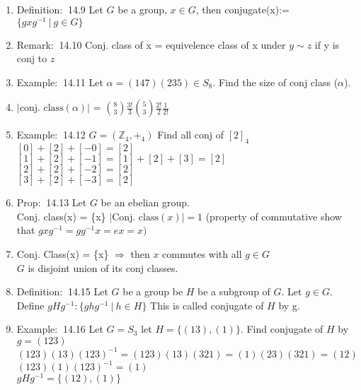 \documentclass[12pt]{article}
\newcommand{\defi}{{\color{blue} Definition: $\ $}}
\newcommand{\exe}{{\color{green} Example: $\ $}}
\newcommand{\prop}{{\color{blue} Prop: $\ $}}
\newcommand{\rem}{{\color{blue} Remark: $\ $}}
\begin{document}
\begin{enumerate}
\begin{enumerate}
        \item \defi 14.9 Let $G$ be a group, $x \in G$, then conjugate(x):= $\{gxg^{-1} \ | \ g \in G\}$
        
        \item \rem 14.10 Conj. class of x = equivelence class of x under $y \sim z$ if y is conj to $z$
        
        \item \exe 14.11 Let $\alpha = (147)(235) \in S_8$. Find the size of conj class ($\alpha$).
        
        \item  $|\text{conj. class} (\alpha)|$ = ${8 \choose 3}\frac{3!}{3} {5 \choose 3}\frac{2!}{2} \frac{1}{2!}$
        
        \item \exe 14.12 $G = (\mathbb{Z}_4, +_4)$ Find all conj of $[2]_4$\\
        $[0] + [2] + [-0] = [2]$\\
        $[1] + [2] + [-1] = [1] + [2] + [3] = [2]$\\
        $[2] + [2] + [-2] = [2]$\\
        $[3] + [2] + [-3] = [2]$

        \item \prop 14.13 Let $G$ be an ebelian group. \\
        Conj. class(x) = \{x\} $|\text{Conj. class}(x)| = 1$ (property of commutative show that $gxg^{-1} = gg^{-1}x = ex = x)$

        \item Conj. Class(x) = \{x\} $\Rightarrow$ then $x$ commutes with all $g \in G$\\
        $G$ is disjoint union of its conj classes.

        \item \defi 14.15 Let $G$ be a group be $H$ be a subgroup of $G$. Let $g \in G$. Define $gHg^{-1}: \{ghg^{-1} \ | \ h \in H\}$ This is called conjugate of $H$ by g.

        \item \exe 14.16 Let $G = S_3$ let $H = \{(13), (1)\}$. Find conjugate of $H$ by $g = (123)$\\
        $(123)(13)(123)^{-1} = (123)(13)(321) = (1)(23)(321) = (12)$\\
        $(123)(1)(123)^{-1} = (1)$\\
        $gHg^{-1} = \{(12),(1)\}$


\end{enumerate}
\end{enumerate}
\end{document}

